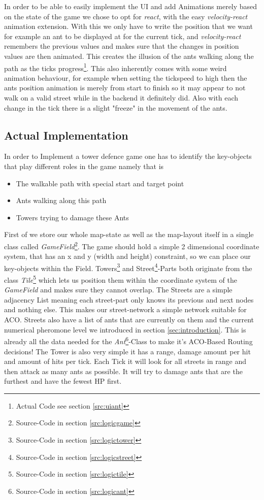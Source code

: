 In order to be able to easily implement the UI and add Animations merely based on the state of the game we chose to opt for \textit{react}\cite{libsreact}, with the easy \textit{velocity-react}\cite{libsreactvelocity} animation extension. With this we only have to write the position that we want for example an ant to be displayed at for the current tick, and \textit{velocity-react} remembers the previous values and makes sure that the changes in position values are then animated. This creates the illusion of the ants walking along the path as the ticks progress\footnote{Actual Code see section \ref{src:uiant}}. This also inherently comes with some weird animation behaviour, for example when setting the tickspeed to high then the ants position animation is merely from start to finish so it may appear to not walk on a valid street while in the backend it definitely did. Also with each change in the tick there is a slight "freeze" in the movement of the ants.

\subsection{Actual Implementation}
\label{sec:implementationactual}

In order to Implement a tower defence game one has to identify the key-objects that play different roles in the game namely that is
\begin{itemize}
\item The walkable path with special start and target point
\item Ants walking along this path
\item Towers trying to damage these Ants
\end{itemize}
First of we store our whole map-state as well as the map-layout itself in a single class called \textit{GameField}\footnote{Source-Code in section \ref{src:logicgame}}. The game should hold a simple 2 dimensional coordinate system, that has an x and y (width and height) constraint, so we can place our key-objects within the Field. Towers\footnote{Source-Code in section \ref{src:logictower}} and Street\footnote{Source-Code in section \ref{src:logicstreet}}-Parts both originate from the class \textit{Tile}\footnote{Source-Code in section \ref{src:logictile}} which lets us position them within the coordinate system of the \textit{GameField} and makes sure they cannot overlap.
The Streets are a simple adjacency List meaning each street-part only knows its previous and next nodes and nothing else. This makes our street-network a simple network suitable for ACO. Streets also have a list of ants that are currently on them and the current numerical pheromone level we introduced in section \ref{sec:introduction}. This is already all the data needed for the \textit{Ant}\footnote{Source-Code in section \ref{src:logicant}}-Class to make it's ACO-Based Routing decisions!
The Tower is also very simple it has a range, damage amount per hit and amount of hits per tick. Each Tick it will look for all streets in range and then attack as many ants as possible. It will try to damage ants that are the furthest and have the fewest HP first.

